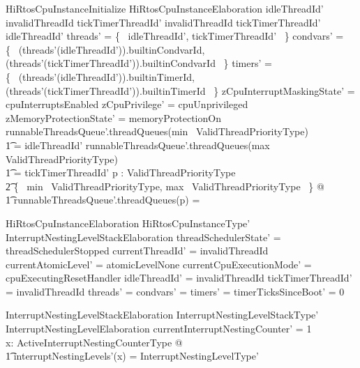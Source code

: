 \documentclass[11pt,letterpaper,twoside,openany]{book}
\begin{document}
\begin{schema}{HiRtosCpuInstanceInitialize}
   HiRtosCpuInstanceElaboration
\where
    idleThreadId' \neq invalidThreadId
\also
    tickTimerThreadId' \neq invalidThreadId
\also
    tickTimerThreadId' \neq idleThreadId'
\also
    \dom threads' = \{~ idleThreadId', tickTimerThreadId' ~\}
\also
    \dom condvars' = \\
   \{~ (threads'(idleThreadId')).builtinCondvarId, \\
      (threads'(tickTimerThreadId')).builtinCondvarId ~\}
\also
    \dom timers' = \\
   \{~ (threads'(idleThreadId')).builtinTimerId, \\
       (threads'(tickTimerThreadId')).builtinTimerId ~\}
\also
    zCpuInterruptMaskingState' = cpuInterruptsEnabled
\also
    zCpuPrivilege' = cpuUnprivileged
\also
    zMemoryProtectionState' = memoryProtectionOn
\also
    runnableThreadsQueue'.threadQueues(min~ ValidThreadPriorityType) \\
    \t1 = \langle idleThreadId' \rangle
\also
    runnableThreadsQueue'.threadQueues(max~ ValidThreadPriorityType) \\
    \t1 = \langle tickTimerThreadId' \rangle
\also
   \forall p : ValidThreadPriorityType \setminus \\
   \t2   \{~ min~ ValidThreadPriorityType, max~ ValidThreadPriorityType ~\} @ \\
   \t1 runnableThreadsQueue'.threadQueues(p) = \emptyset
\end{schema}

\begin{schema}{HiRtosCpuInstanceElaboration}
    HiRtosCpuInstanceType' \\
    InterruptNestingLevelStackElaboration
\where
    threadSchedulerState' = threadSchedulerStopped
\also
    currentThreadId' = invalidThreadId
\also
    currentAtomicLevel' = atomicLevelNone
\also
    currentCpuExecutionMode' = cpuExecutingResetHandler
\also
    idleThreadId' = invalidThreadId
\also
    tickTimerThreadId' = invalidThreadId
\also
    threads' = \emptyset
\also
    condvars' = \emptyset
\also
    timers' = \emptyset
\also
    timerTicksSinceBoot' = 0
\end{schema}

\begin{schema}{InterruptNestingLevelStackElaboration}
   InterruptNestingLevelStackType' \\
   InterruptNestingLevelElaboration
\where
   currentInterruptNestingCounter' = 1 \\
\also
   \forall x: ActiveInterruptNestingCounterType @ \\
\t1   interruptNestingLevels'(x) = \theta InterruptNestingLevelType' \\
\end{schema}
\end{document}
